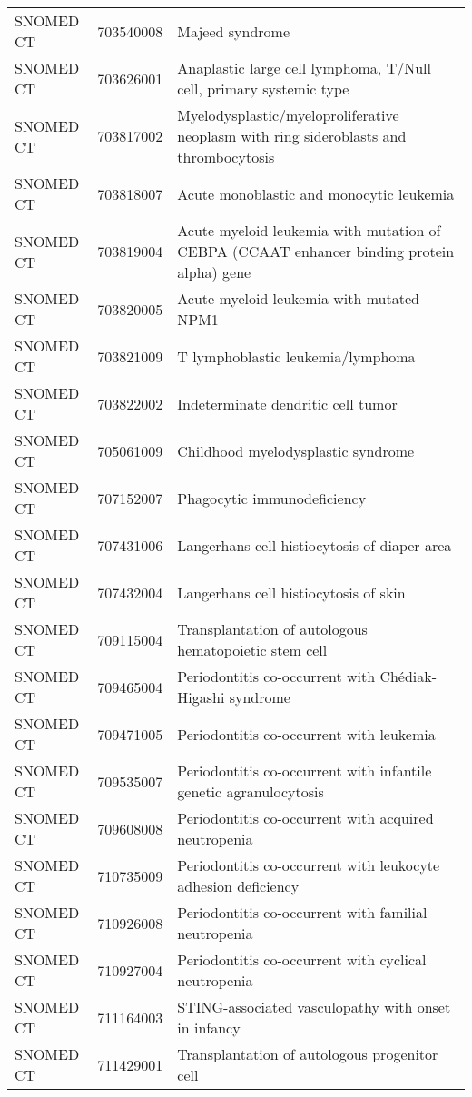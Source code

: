 \begin{table}[ht]
\begin{tabular}{lll}
  SNOMED CT & 703540008 & Majeed syndrome \\ 
  SNOMED CT & 703626001 & Anaplastic large cell lymphoma, T/Null cell, primary systemic type \\ 
  SNOMED CT & 703817002 & Myelodysplastic/myeloproliferative neoplasm with ring sideroblasts and thrombocytosis \\ 
  SNOMED CT & 703818007 & Acute monoblastic and monocytic leukemia \\ 
  SNOMED CT & 703819004 & Acute myeloid leukemia with mutation of CEBPA (CCAAT enhancer binding protein alpha) gene \\ 
  SNOMED CT & 703820005 & Acute myeloid leukemia with mutated NPM1 \\ 
  SNOMED CT & 703821009 & T lymphoblastic leukemia/lymphoma \\ 
  SNOMED CT & 703822002 & Indeterminate dendritic cell tumor \\ 
  SNOMED CT & 705061009 & Childhood myelodysplastic syndrome \\ 
  SNOMED CT & 707152007 & Phagocytic immunodeficiency \\ 
  SNOMED CT & 707431006 & Langerhans cell histiocytosis of diaper area \\ 
  SNOMED CT & 707432004 & Langerhans cell histiocytosis of skin \\ 
  SNOMED CT & 709115004 & Transplantation of autologous hematopoietic stem cell \\ 
  SNOMED CT & 709465004 & Periodontitis co-occurrent with Chédiak-Higashi syndrome \\ 
  SNOMED CT & 709471005 & Periodontitis co-occurrent with leukemia \\ 
  SNOMED CT & 709535007 & Periodontitis co-occurrent with infantile genetic agranulocytosis \\ 
  SNOMED CT & 709608008 & Periodontitis co-occurrent with acquired neutropenia \\ 
  SNOMED CT & 710735009 & Periodontitis co-occurrent with leukocyte adhesion deficiency \\ 
  SNOMED CT & 710926008 & Periodontitis co-occurrent with familial neutropenia \\ 
  SNOMED CT & 710927004 & Periodontitis co-occurrent with cyclical neutropenia \\ 
  SNOMED CT & 711164003 & STING-associated vasculopathy with onset in infancy \\ 
  SNOMED CT & 711429001 & Transplantation of autologous progenitor cell \\ 

\end{tabular}
\end{table}
